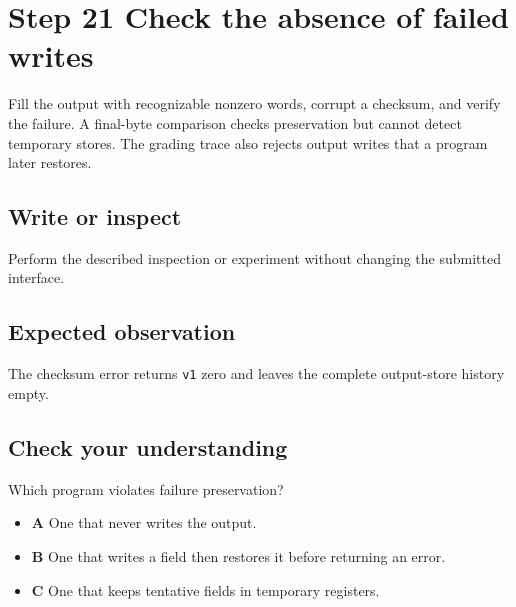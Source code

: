 \section{Step 21 Check the absence of failed writes}\label{packet-s21}

Fill the output with recognizable nonzero words, corrupt a checksum, and verify the failure. A final-byte comparison checks preservation but cannot detect temporary stores. The grading trace also rejects output writes that a program later restores.

\subsection{Write or inspect}
Perform the described inspection or experiment without changing the submitted interface.

\subsection{Expected observation}
The checksum error returns \texttt{v1} zero and leaves the complete output-store history empty.

\subsection{Check your understanding}
Which program violates failure preservation?

\begin{itemize}
  \item \textbf{A} One that never writes the output.
  \item \textbf{B} One that writes a field then restores it before returning an error.
  \item \textbf{C} One that keeps tentative fields in temporary registers.
\end{itemize}
